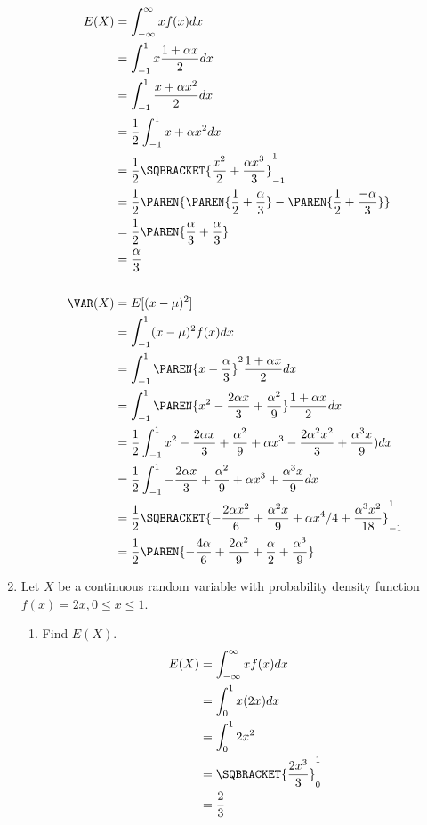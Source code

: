 \documentclass[10pt,a4paper]{report}
\newcommand{\BLUE}[1]{\textcolor{blue}{#1}}
\begin{document}
\begin{enumerate}
	\BLUE{\begin{align*}
		E(X) &= \int_{-\infty}^\infty xf(x) dx \\
		&= \int_{-1}^1 x\frac{1+\alpha x}{2}dx \\
		&= \int_{-1}^1 \frac{x+\alpha x^2}{2}dx \\
		&= \frac{1}{2}\int_{-1}^1 x+\alpha x^2dx \\
		&= \frac{1}{2}\SQBRACKET{\frac{x^2}{2} + \frac{\alpha x^3}{3}}_{-1}^1 \\
		&= \frac{1}{2}\PAREN{\PAREN{\frac{1}{2} + \frac{\alpha}{3}}-\PAREN{\frac{1}{2} + \frac{-\alpha}{3}}} \\
		&= \frac{1}{2}\PAREN{\frac{\alpha}{3}+\frac{\alpha}{3}} \\
		&= \frac{\alpha}{3} \\
		\\
		\VAR(X) &= E[(x - \mu)^2]\\
		&=  \int_{-1}^1 (x - \mu)^2f(x)dx \\
		&=  \int_{-1}^1 \PAREN{x - \frac{\alpha}{3}}^2\frac{1+\alpha x}{2}dx \\
		&=  \int_{-1}^1 \PAREN{x^2-\frac{2\alpha x}{3} + \frac{\alpha^2}{9}}\frac{1+\alpha x}{2}dx \\
		&=  \frac{1}{2}\int_{-1}^1 x^2-\frac{2\alpha x}{3} + \frac{\alpha^2}{9} + \alpha x^3-\frac{2\alpha^2 x^2}{3} + \frac{\alpha^3 x}{9}) dx \\
		&=  \frac{1}{2}\int_{-1}^1 -\frac{2\alpha x}{3} + \frac{\alpha^2}{9} + \alpha x^3 + \frac{\alpha^3 x}{9} dx \\
		&= \frac{1}{2}\SQBRACKET{-\frac{2\alpha x^2}{6} + \frac{\alpha^2x}{9} + \alpha x^4/4 + \frac{\alpha^3 x^2}{18}}_{-1}^1 \\
		&= \frac{1}{2}\PAREN{-\frac{4\alpha}{6} + \frac{2\alpha^2}{9} + \frac{\alpha}{2}  + \frac{\alpha^3}{9}}
	\end{align*}
	}
	\item Let $X$ be a continuous random variable with probability density function $f(x) = 2x, 0\le x \le 1$.
	\begin{enumerate}
		\item Find $E(X)$.
		\BLUE{\begin{align*}
			E(X) &= \int_{-\infty}^\infty  xf(x)dx \\
			&=  \int_{0}^1  x(2x)dx \\
			&=  \int_{0}^1  2x^2 \\
			&= \SQBRACKET{\frac{2x^3}{3}}_{0}^1 \\
			&= \frac{2}{3}
		\end{align*} }

\end{enumerate}
\end{enumerate}
\end{document}
